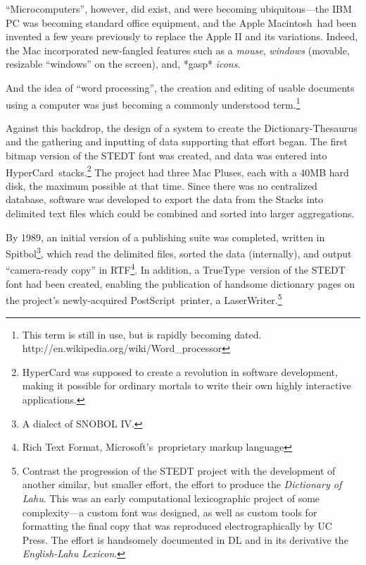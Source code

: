 ``Microcomputers'', however, did exist, and were becoming ubiquitous---the IBM PC was becoming standard
office equipment, and the Apple Macintosh\texttrademark\ had been invented
a few years previously to replace the Apple II and its variations.  
Indeed, the Mac incorporated new-fangled features such
as a {\it mouse}, {\it windows} (movable, resizable ``windows'' on the
screen), and, *gasp* {\it icons}.

And the idea of ``word processing'', the creation and editing of usable
documents using a computer was just becoming a commonly understood
term.\footnote{This term is still in use, but is rapidly becoming
dated. http://en.wikipedia.org/wiki/Word\_processor}

Against this backdrop, the design of a system to create 
the Dictionary-Thesaurus and the gathering and inputting of data supporting
that effort began.  The first bitmap version of
the STEDT font was created, and data was entered into HyperCard\texttrademark\
stacks.\footnote{HyperCard was supposed to create a revolution in software
  development, making it possible for ordinary mortals to write their
  own highly interactive applications.}  The project had three Mac Pluses\texttrademark, each with a 40MB hard
disk, the maximum possible at that time.  Since there was no
centralized database, software was developed to export the data from the Stacks
into delimited text files which could be combined and sorted into
larger aggregations.

By 1989, an initial version of a publishing suite was completed, written in Spitbol\footnote{A
  dialect of SNOBOL IV.}, which read the delimited files, sorted the
data (internally), and output ``camera-ready copy'' in
RTF\footnote{Rich Text Format, Microsoft's\texttrademark\ proprietary markup
  language}.   In addition, a TrueType\texttrademark\ version of the STEDT font
had been created, enabling the publication of handsome dictionary
pages on the project's newly-acquired PostScript\texttrademark\ printer, a
LaserWriter\texttrademark.\footnote{Contrast the progression of the
  STEDT project with the development of another similar, but smaller
  effort, the effort to produce the {\it Dictionary of Lahu}. This was
  an early computational lexicographic project of some complexity---a custom
  font was designed, as well as custom tools for formatting the final
  copy that was reproduced electrographically by UC Press.  The effort
  is handsomely documented in DL and in its derivative the {\it English-Lahu Lexicon}.}

